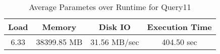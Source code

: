 \documentclass[../../main.tex]{subfiles}
\begin{document}
    \begin{table}
        \begin{center}
            \begin{tabular}{ |c|c|c|c| } 
            \hline
            Load & Memory & Disk IO & Execution Time\\
            \hline
            6.33 & 38399.85 MB & 31.56 MB/sec & 404.50 sec \\
            \hline
            \end{tabular}
            \\[1pt]
            \caption{Average Parametes over Runtime for Query11}
        \end{center}
    \end{table}
    \pagebreak
\end{document}
